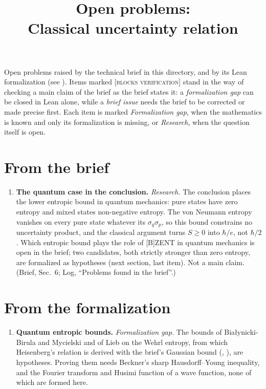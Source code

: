 \documentclass[11pt]{article}
\title{Open problems:\\ Classical uncertainty relation}
\author{}
\date{}
\begin{document}
\maketitle

\noindent
Open problems raised by the technical brief in this directory, and by its Lean formalization
(see ).
Items marked \textsc{[blocks verification]} stand in the way of checking a main
claim of the brief as the brief states it: a \emph{formalization gap} can be closed
in Lean alone, while a \emph{brief issue} needs the brief to be corrected or made
precise first.
Each item is marked \emph{Formalization gap}, when the mathematics is known and only its
formalization is missing, or \emph{Research}, when the question itself is open.

\section*{From the brief}
\begin{enumerate}
\item \textbf{The quantum case in the conclusion.} \emph{Research.} The conclusion places the lower entropic bound
  in quantum mechanics: pure states have zero entropy and mixed states non-negative entropy. The
  von Neumann entropy vanishes on every pure state whatever its $\sigma_q\sigma_p$, so this bound
  constrains no uncertainty product, and the classical argument turns $S \ge 0$ into
  $\hbar/e$, not $\hbar/2$. Which entropic bound plays the role of [B]ZENT in quantum mechanics is
  open in the brief; two candidates, both strictly stronger than zero entropy, are formalized as
  hypotheses (next section, last item). Not a main claim. (Brief, Sec.~6; Log, ``Problems
  found in the brief''.)
\end{enumerate}

\section*{From the formalization}
\begin{enumerate}
\item \textbf{Quantum entropic bounds.} \emph{Formalization gap.} The bounds of Bia\l{}ynicki-Birula and Mycielski and of
  Lieb on the Wehrl entropy, from which Heisenberg's relation is derived with the brief's
  Gaussian bound (, ),
  are hypotheses. Proving them needs Beckner's sharp Hausdorff--Young inequality, and the
  Fourier transform and Husimi function of a wave function, none of which are formed here.
\end{enumerate}
\end{document}
